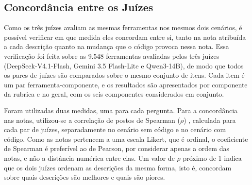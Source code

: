 
\subsection{Concordância entre os Juízes}
\label{subsec:concordancia-juizes}

Como os três juízes avaliam as mesmas ferramentas nos mesmos dois cenários, é possível verificar em que medida eles concordam entre si, tanto na nota atribuída a cada descrição quanto na mudança que o código provoca nessa nota. Essa verificação foi feita sobre as 9.548 ferramentas avaliadas pelos três juízes (DeepSeek-V4.1-Flash, Gemini 3.5 Flash-Lite e Qwen3-14B), de modo que todos os pares de juízes são comparados sobre o mesmo conjunto de itens. Cada item é um par ferramenta-componente, e os resultados são apresentados por componente da rubrica e no geral, com os seis componentes considerados em conjunto.

Foram utilizadas duas medidas, uma para cada pergunta. Para a concordância nas notas, utilizou-se a correlação de postos de Spearman ($\rho$) \cite{spearman1904proof}, calculada para cada par de juízes, separadamente no cenário sem código e no cenário com código. Como as notas pertencem a uma escala Likert, que é ordinal, o coeficiente de Spearman é preferível ao de Pearson, por considerar apenas a ordem das notas, e não a distância numérica entre elas. Um valor de $\rho$ próximo de 1 indica que os dois juízes ordenam as descrições da mesma forma, isto é, concordam sobre quais descrições são melhores e quais são piores.


